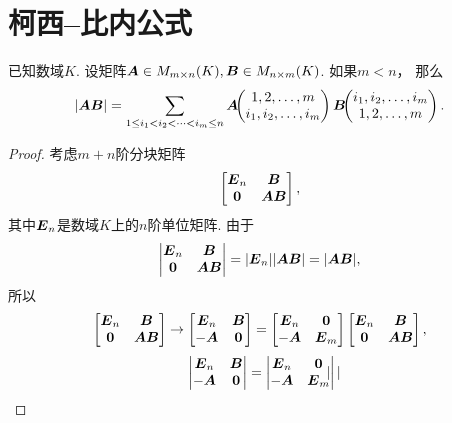 \section{柯西--比内公式}
\begin{theorem}
已知数域\(K\).
设矩阵\(\boldsymbol{A} \in M_{m \times n}(K),
\boldsymbol{B} \in M_{n \times m}(K)\).
如果\(m < n\)，
那么\begin{equation}\label{equation:线性方程组.柯西比内公式}
	\abs{\boldsymbol{A}\boldsymbol{B}}
	= \sum_{1 \leq i_1 < i_2 < \dotsb < i_m \leq n}
	\boldsymbol{A}\kern-3.8pt\begin{pmatrix}
		1,2,\dotsc,m \\
		i_1,i_2,\dotsc,i_m
	\end{pmatrix}
	\boldsymbol{B}\kern-3.8pt\begin{pmatrix}
		i_1,i_2,\dotsc,i_m \\
		1,2,\dotsc,m
	\end{pmatrix}.
\end{equation}
\begin{proof}
考虑\(m+n\)阶分块矩阵\[
	\begin{bmatrix}
		\boldsymbol{E}_n & \boldsymbol{B} \\
		\boldsymbol0 & \boldsymbol{A}\boldsymbol{B}
	\end{bmatrix},
\]
其中\(\boldsymbol{E}_n\)是数域\(K\)上的\(n\)阶单位矩阵.
由于\[
	\begin{vmatrix}
		\boldsymbol{E}_n & \boldsymbol{B} \\
		\boldsymbol0 & \boldsymbol{A}\boldsymbol{B}
	\end{vmatrix}
	= \abs{\boldsymbol{E}_n} \abs{\boldsymbol{A}\boldsymbol{B}}
	= \abs{\boldsymbol{A}\boldsymbol{B}},
\]
所以\[
	\begin{bmatrix}
		\boldsymbol{E}_n & \boldsymbol{B} \\
		\boldsymbol0 & \boldsymbol{A}\boldsymbol{B}
	\end{bmatrix}
	\to
	\begin{bmatrix}
		\boldsymbol{E}_n & \boldsymbol{B} \\
		-\boldsymbol{A} & \boldsymbol0
	\end{bmatrix}
	= \begin{bmatrix}
		\boldsymbol{E}_n & \boldsymbol0 \\
		-\boldsymbol{A} & \boldsymbol{E}_m
	\end{bmatrix} \begin{bmatrix}
		\boldsymbol{E}_n & \boldsymbol{B} \\
		\boldsymbol0 & \boldsymbol{A}\boldsymbol{B}
	\end{bmatrix},
\]\[
	\begin{vmatrix}
		\boldsymbol{E}_n & \boldsymbol{B} \\
		-\boldsymbol{A} & \boldsymbol0
	\end{vmatrix}
	= \begin{vmatrix}
		\boldsymbol{E}_n & \boldsymbol0 \\
		-\boldsymbol{A} & \boldsymbol{E}_m
	\end{vmatrix} \begin{vmatrix}

\end{vmatrix}\]
\end{proof}
\end{theorem}
